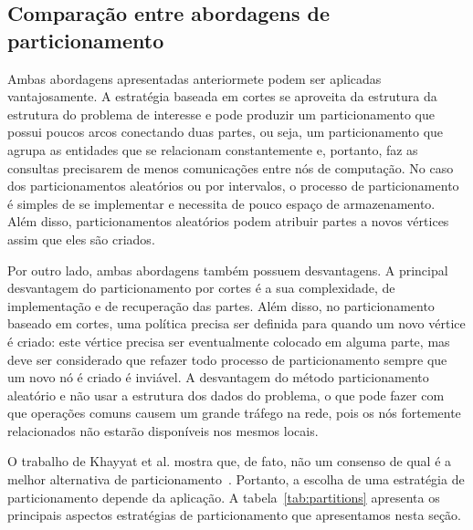 \documentclass[conference]{IEEEtran}
\begin{document}
\subsection{Comparação entre abordagens de particionamento}
Ambas abordagens apresentadas anteriormete podem ser aplicadas
vantajosamente. A estratégia baseada em cortes se aproveita da estrutura
da estrutura do problema de interesse e pode produzir um particionamento
que possui poucos arcos conectando duas partes, ou seja, um
particionamento que agrupa as entidades que se relacionam constantemente
e, portanto, faz as consultas precisarem de menos comunicações entre
nós de computação. No caso dos particionamentos aleatórios ou por
intervalos, o processo de particionamento é simples de se implementar
e necessita de pouco espaço de armazenamento. Além disso,
particionamentos aleatórios podem atribuir partes a novos vértices assim
que eles são criados.

Por outro lado, ambas abordagens também possuem desvantagens. A
principal desvantagem do particionamento por cortes é a sua
complexidade, de implementação e de recuperação das partes. Além disso,
no particionamento baseado em cortes, uma política precisa ser definida
para quando um novo vértice é criado: este vértice precisa ser
eventualmente colocado em alguma parte, mas deve ser considerado que
refazer todo processo de particionamento sempre que um novo nó é criado
é inviável. A desvantagem do método particionamento aleatório e não
usar a estrutura dos dados do problema, o que pode fazer com que
operações comuns causem um grande tráfego na rede, pois os nós
fortemente relacionados não estarão disponíveis nos mesmos locais.

O trabalho de Khayyat et al. mostra que, de fato, não um consenso de
qual é a melhor alternativa de particionamento~\cite{mizan}. Portanto,
a escolha de uma estratégia de particionamento depende da aplicação. A
tabela~\ref{tab:partitions} apresenta os principais aspectos
estratégias de particionamento que apresentamos nesta seção.
\end{document}
